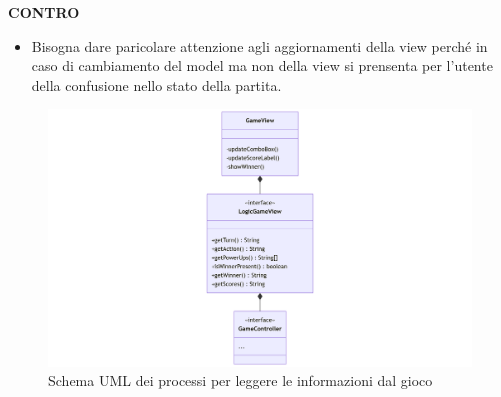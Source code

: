 \documentclass[a4paper,12pt]{report}
\begin{document}
\textbf{CONTRO}
\begin{itemize}
	\item Bisogna dare paricolare attenzione agli aggiornamenti della view perché in caso di cambiamento del model ma non della view si prensenta per l'utente della confusione 
	nello stato della partita.
\end{itemize}
\begin{figure}[H]
	\centering{}
	\includegraphics[width=14cm]{img/TraduzioneInformazioni.png}
	\caption{Schema UML dei processi per leggere le informazioni dal gioco}
	\label{img:Traduzione Informazioni}
\end{figure}

\newpage
\end{document}
